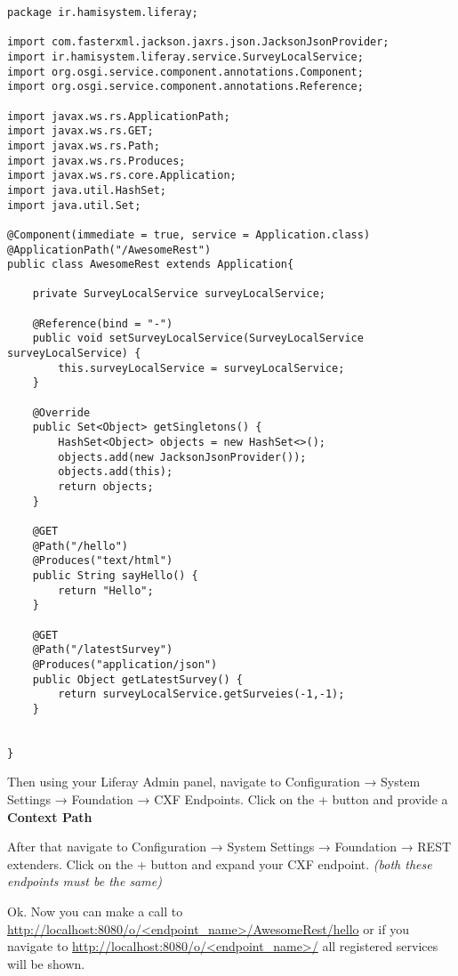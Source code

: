 \lstset{language=Java}
\begin{lstlisting}[caption=AwesomeRest.java]
package ir.hamisystem.liferay;

import com.fasterxml.jackson.jaxrs.json.JacksonJsonProvider;
import ir.hamisystem.liferay.service.SurveyLocalService;
import org.osgi.service.component.annotations.Component;
import org.osgi.service.component.annotations.Reference;

import javax.ws.rs.ApplicationPath;
import javax.ws.rs.GET;
import javax.ws.rs.Path;
import javax.ws.rs.Produces;
import javax.ws.rs.core.Application;
import java.util.HashSet;
import java.util.Set;

@Component(immediate = true, service = Application.class)
@ApplicationPath("/AwesomeRest")
public class AwesomeRest extends Application{

    private SurveyLocalService surveyLocalService;

    @Reference(bind = "-")
    public void setSurveyLocalService(SurveyLocalService surveyLocalService) {
        this.surveyLocalService = surveyLocalService;
    }

    @Override
    public Set<Object> getSingletons() {
        HashSet<Object> objects = new HashSet<>();
        objects.add(new JacksonJsonProvider());
        objects.add(this);
        return objects;
    }

    @GET
    @Path("/hello")
    @Produces("text/html")
    public String sayHello() {
        return "Hello";
    }

    @GET
    @Path("/latestSurvey")
    @Produces("application/json")
    public Object getLatestSurvey() {
        return surveyLocalService.getSurveies(-1,-1);
    }


}
\end{lstlisting}


Then using your Liferay Admin panel, navigate to  Configuration → System Settings → Foundation → CXF Endpoints. Click on the + button and provide a \textbf{Context Path}

After that navigate to Configuration → System Settings → Foundation → REST extenders. Click on the + button and expand your CXF endpoint. \textit{(both these endpoints must be the same)}

Ok. Now you can make a call to \url{http://localhost:8080/o/<endpoint_name>/AwesomeRest/hello} or if you navigate to \url{http://localhost:8080/o/<endpoint_name>/} all registered services will be shown.